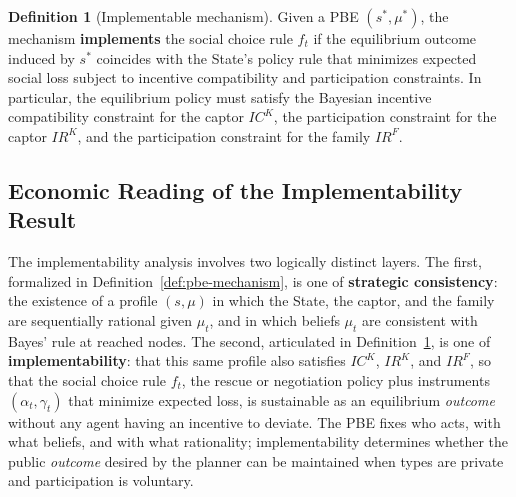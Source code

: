 \documentclass[12pt,a4paper]{article}
\theoremstyle{plain}
\theoremstyle{definition}
\newtheorem{definition}[theorem]{Definition}
\theoremstyle{remark}
\newcommand{\1}{\mathbf{1}}
\begin{document}
\begin{definition}[Implementable mechanism]
\label{def:implementable-mechanism}
Given a PBE $(s^\ast,\mu^\ast)$, the mechanism \textbf{implements} the social choice
rule $f_t$ if the equilibrium outcome induced by $s^\ast$ coincides with the State's
policy rule that minimizes expected social loss subject to incentive compatibility and
participation constraints. In particular, the equilibrium policy must satisfy the
Bayesian incentive compatibility constraint for the captor $IC^K$, the participation
constraint for the captor $IR^K$, and the participation constraint for the family
$IR^F$.
\end{definition}


\subsection{Economic Reading of the Implementability Result}

\noindent The implementability analysis involves two logically distinct layers. The first,
formalized in Definition~\ref{def:pbe-mechanism}, is one of \textbf{strategic
consistency}: the existence of a profile $(s,\mu)$ in which the State, the captor, and
the family are sequentially rational given $\mu_t$, and in which beliefs $\mu_t$ are
consistent with Bayes' rule at reached nodes. The second, articulated in
Definition~\ref{def:implementable-mechanism}, is one of \textbf{implementability}: that
this same profile also satisfies $IC^K$, $IR^K$, and $IR^F$, so that the social choice
rule $f_t$, the rescue or negotiation policy plus instruments $(\alpha_t,\gamma_t)$
that minimize expected loss, is sustainable as an equilibrium \emph{outcome} without
any agent having an incentive to deviate. The PBE fixes who acts, with what beliefs, and
with what rationality; implementability determines whether the public \emph{outcome}
desired by the planner can be maintained when types are private and participation is
voluntary.

\medskip
\end{document}

